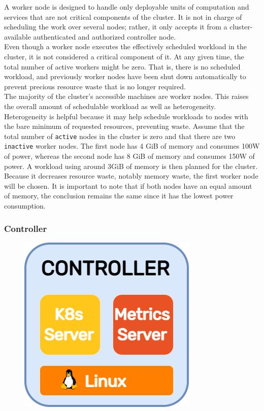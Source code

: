 A worker node is designed to handle only deployable units of computation and services
that are not critical components of the cluster. It is not in charge of
scheduling the work over several nodes; rather, it only accepts it from a
cluster-available authenticated and authorized controller node. \\ %
Even though a worker node executes the effectively scheduled workload in the
cluster, it is not considered a critical component of it. At any given time, the
total number of active workers might be zero. That is, there is no scheduled workload,
and previously worker nodes have been shut down automatically to prevent
precious resource waste that is no longer required. \\ %
The majority of the cluster's accessible machines are worker nodes. This raises the
overall amount of schedulable workload as well as heterogeneity. Heterogeneity
is helpful because it may help schedule workloads to nodes with the bare minimum
of requested resources, preventing waste. Assume that the total number of
\texttt{active} nodes in the cluster is zero and that there are two \texttt{inactive}
worker nodes. The first node has 4 GiB of memory and consumes 100W of power,
whereas the second node has 8 GiB of memory and consumes 150W of power. A workload
using around 3GiB of memory is then planned for the cluster. Because it
decreases resource waste, notably memory waste, the first worker node will be
chosen. It is important to note that if both nodes have an equal amount of memory,
the conclusion remains the same since it has the lowest power consumption.

\subsubsection{Controller}
\label{subsubsec:architecture_components_node_controller}

\begin{figure}
  \centering
  \includegraphics[width=.2\textwidth]{images/architecture/controller.png}
\end{figure}

